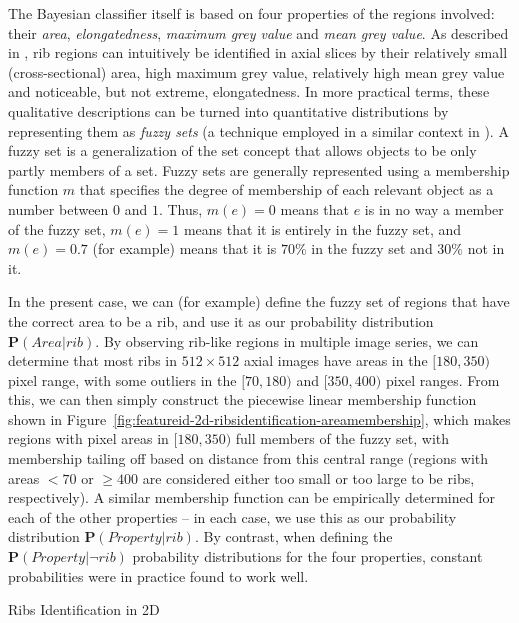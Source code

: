 \noindent The Bayesian classifier itself is based on four properties of the regions involved: their \emph{area}, \emph{elongatedness}, \emph{maximum grey value} and \emph{mean grey value}. As described in \cite{gvccimi08}, rib regions can intuitively be identified in axial slices by their relatively small (cross-sectional) area, high maximum grey value, relatively high mean grey value and noticeable, but not extreme, elongatedness. In more practical terms, these qualitative descriptions can be turned into quantitative distributions by representing them as \emph{fuzzy sets} (a technique employed in a similar context in \cite{lee03}). A fuzzy set is a generalization of the set concept that allows objects to be only partly members of a set. Fuzzy sets are generally represented using a membership function $m$ that specifies the degree of membership of each relevant object as a number between $0$ and $1$. Thus, $m(e) = 0$ means that $e$ is in no way a member of the fuzzy set, $m(e) = 1$ means that it is entirely in the fuzzy set, and $m(e) = 0.7$ (for example) means that it is $70\%$ in the fuzzy set and $30\%$ not in it.

In the present case, we can (for example) define the fuzzy set of regions that have the correct area to be a rib, and use it as our probability distribution $\mathbf{P}(\mathit{Area} | \mathit{rib})$. By observing rib-like regions in multiple image series, we can determine that most ribs in $512 \times 512$ axial images have areas in the $[180,350)$ pixel range, with some outliers in the $[70,180)$ and $[350,400)$ pixel ranges. From this, we can then simply construct the piecewise linear membership function shown in Figure~\ref{fig:featureid-2d-ribsidentification-areamembership}, which makes regions with pixel areas in $[180,350)$ full members of the fuzzy set, with membership tailing off based on distance from this central range (regions with areas $< 70$ or $\ge 400$ are considered either too small or too large to be ribs, respectively). A similar membership function can be empirically determined for each of the other properties -- in each case, we use this as our probability distribution $\mathbf{P}(\mathit{Property} | \mathit{rib})$. By contrast, when defining the $\mathbf{P}(\mathit{Property} | \neg\mathit{rib})$ probability distributions for the four properties, constant probabilities were in practice found to work well.

\begin{stulisting}[p]
\caption{Ribs Identification in 2D}
\label{code:featureid-2d-ribsidentification}

\end{stulisting}

